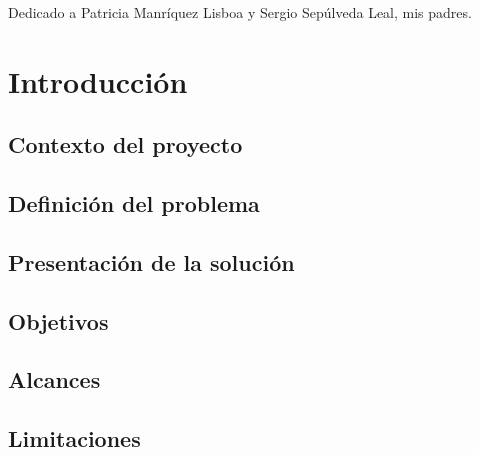 \documentclass{iccmemoria}
\author{Yorch Sepúlveda Manríquez}
\date{Julio, 2019}
\begin{document}
\maketitle

\begin{dedicatory}
Dedicado a Patricia Manríquez Lisboa y Sergio Sepúlveda Leal, mis padres.
\end{dedicatory}



\tableofcontents
\listoffigures
\listoftables




\chapter{Introducción}
    \label{sec:Intro}
	

	\section{Contexto del proyecto}
	\label{sec:Contexto}
	

	\section{Definición del problema}
	\label{sec:Problema}
	

	\section{Presentación de la solución}
	\label{sec:Solucion}
	

	\section{Objetivos}
	\label{sec:Objetivos}
	

	\section{Alcances}
	

	\section{Limitaciones}
	
\end{document}
